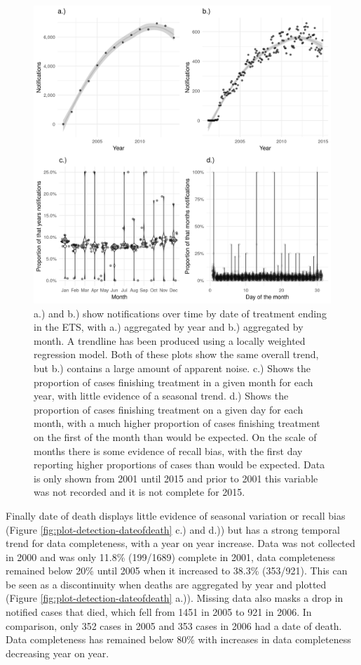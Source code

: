 \documentclass[11pt,twoside]{bristolthesis}
\begin{document}
  \begin{figure}
  
  {\centering \includegraphics[width=0.8\linewidth,]{chapters/tb-epi-england/figures/plot-detection-treatend} 
  
  }
  
  \caption[a.) and b.) show notifications over time by date of treatment ending in the ETS, with a.) aggregated by year and  b.) aggregated by month.]{a.) and b.) show notifications over time by date of treatment ending in the ETS, with a.) aggregated by year and  b.) aggregated by month. A trendline has been produced using a locally weighted regression model. Both of these plots show the same overall trend, but b.) contains a large amount of apparent noise. c.) Shows the proportion of cases finishing treatment in a given month for each year, with little evidence of a seasonal trend. d.) Shows the proportion of cases finishing treatment on a given day for each month, with a much higher proportion of cases finishing treatment on the first of the month than would be expected. On the scale of months there is some evidence of recall bias, with the first day reporting higher proportions of cases than would be expected. Data is only shown from 2001 until 2015 and prior to 2001 this variable was not recorded and it is not complete for 2015.}\label{fig:plot-detection-treatend}
  \end{figure}
  Finally date of death displays little evidence of seasonal variation or recall bias (Figure \ref{fig:plot-detection-dateofdeath} c.) and d.)) but has a strong temporal trend for data completeness, with a year on year increase. Data was not collected in 2000 and was only 11.8\% (199/1689) complete in 2001, data completeness remained below 20\% until 2005 when it increased to 38.3\% (353/921). This can be seen as a discontinuity when deaths are aggregated by year and plotted (Figure \ref{fig:plot-detection-dateofdeath} a.)). Missing data also masks a drop in notified cases that died, which fell from 1451 in 2005 to 921 in 2006. In comparison, only 352 cases in 2005 and 353 cases in 2006 had a date of death. Data completeness has remained below 80\% with increases in data completeness decreasing year on year.
\end{document}
